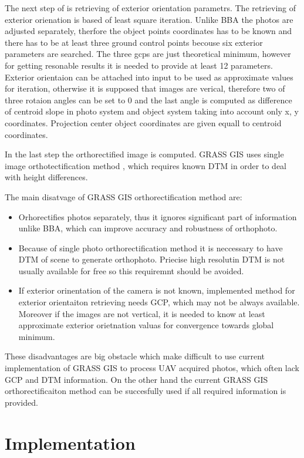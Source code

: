 \documentclass[a4paper,12pt]{report}
\begin{document}
The next step of is retrieving of exterior orientation parametrs. The retrieving 
of exterior orienation is based of least square iteration. Unlike BBA
the photos are adjusted separately, therfore the object points coordinates has to be known
and there has to be at least three ground control points becouse six exterior parameters are 
searched. The three gcps are just theoretical minimum, however for getting resonable 
results it is needed to provide at least 12 parameters. Exterior orientaion 
can be attached into input to be used as approximate values for iteration,
otherwise it is supposed that images are verical, therefore two of three rotaion
angles can be set to 0 and the last angle is computed as difference of centroid slope
in photo system and object system taking into account only x, y coordinates.
Projection center object coordinates are given equall to centroid coordinates.

In the last step the orthorectified image is computed. GRASS GIS uses single image orthotectification
method \label{sec:single_ortho}, which requires known DTM in order to deal with height differences. 


The main disatvage of GRASS GIS orthorectification method are:
\begin{itemize}
\item Orhorectifies photos separately, thus it ignores significant part of information unlike BBA,
 which can improve accuracy and robustness of orthophoto. 
\item Because of single photo orthorectification method it is neccessary to have DTM of scene to 
generate orthophoto. Priecise high resolutin DTM is not usually available for free so this 
requiremnt should be avoided.
\item If exterior orinentation of the camera is not known, implemented method for exterior
orientaiton retrieving needs GCP, which may not be always available. Moreover  if the images 
are not vertical, it is needed to know at least approximate exterior orietnation valuas for 
convergence towards global minimum.
\end{itemize}

These disadvantages are big obstacle which make difficult to use current implementation of GRASS GIS 
to process UAV acquired photos, which often lack GCP and DTM information.
On the other hand the current GRASS GIS orthorectificaiton method can be succesfully used  
if all required information is provided.

\chapter{Implementation}
\end{document}
